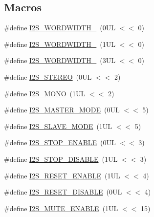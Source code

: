 \subsection*{Macros}
\begin{DoxyCompactItemize}
\item 
\#define \hyperlink{group___i2_s__18_x_x__43_x_x_ga17cb1a91d5be4e7afad486ead6d2980d}{I2\+S\+\_\+\+W\+O\+R\+D\+W\+I\+D\+T\+H\+\_}~(0\+U\+L $<$$<$ 0)
\item 
\#define \hyperlink{group___i2_s__18_x_x__43_x_x_ga4d016baad0fba07da20a6410470c71d3}{I2\+S\+\_\+\+W\+O\+R\+D\+W\+I\+D\+T\+H\+\_}~(1\+U\+L $<$$<$ 0)
\item 
\#define \hyperlink{group___i2_s__18_x_x__43_x_x_ga683d81436e91c1631bdd5947ee78489b}{I2\+S\+\_\+\+W\+O\+R\+D\+W\+I\+D\+T\+H\+\_}~(3\+U\+L $<$$<$ 0)
\item 
\#define \hyperlink{group___i2_s__18_x_x__43_x_x_ga07e34ebc83183644aa54cc124b769a43}{I2\+S\+\_\+\+S\+T\+E\+R\+EO}~(0\+U\+L $<$$<$ 2)
\item 
\#define \hyperlink{group___i2_s__18_x_x__43_x_x_ga3c732d1467300d87c582a1497e8dbadf}{I2\+S\+\_\+\+M\+O\+NO}~(1\+U\+L $<$$<$ 2)
\item 
\#define \hyperlink{group___i2_s__18_x_x__43_x_x_ga67cd00ecbec35d0dd723909916fb1014}{I2\+S\+\_\+\+M\+A\+S\+T\+E\+R\+\_\+\+M\+O\+DE}~(0\+U\+L $<$$<$ 5)
\item 
\#define \hyperlink{group___i2_s__18_x_x__43_x_x_ga37137132251bc15250edcea1585d3e58}{I2\+S\+\_\+\+S\+L\+A\+V\+E\+\_\+\+M\+O\+DE}~(1\+U\+L $<$$<$ 5)
\item 
\#define \hyperlink{group___i2_s__18_x_x__43_x_x_gabe1e11f6f4ce8542408e466b3316ca3c}{I2\+S\+\_\+\+S\+T\+O\+P\+\_\+\+E\+N\+A\+B\+LE}~(0\+U\+L $<$$<$ 3)
\item 
\#define \hyperlink{group___i2_s__18_x_x__43_x_x_gaf442a366f6467626a2f72fdabf9b6d89}{I2\+S\+\_\+\+S\+T\+O\+P\+\_\+\+D\+I\+S\+A\+B\+LE}~(1\+U\+L $<$$<$ 3)
\item 
\#define \hyperlink{group___i2_s__18_x_x__43_x_x_gae090c11fade3a6f9bf9791dba1920556}{I2\+S\+\_\+\+R\+E\+S\+E\+T\+\_\+\+E\+N\+A\+B\+LE}~(1\+U\+L $<$$<$ 4)
\item 
\#define \hyperlink{group___i2_s__18_x_x__43_x_x_gaf008515f40666122bb1936e591b7ed99}{I2\+S\+\_\+\+R\+E\+S\+E\+T\+\_\+\+D\+I\+S\+A\+B\+LE}~(0\+U\+L $<$$<$ 4)
\item 
\#define \hyperlink{group___i2_s__18_x_x__43_x_x_ga3f418f8bc5e6f401481d3b9e241758bb}{I2\+S\+\_\+\+M\+U\+T\+E\+\_\+\+E\+N\+A\+B\+LE}~(1\+U\+L $<$$<$ 15)
\item 

\end{DoxyCompactItemize}
